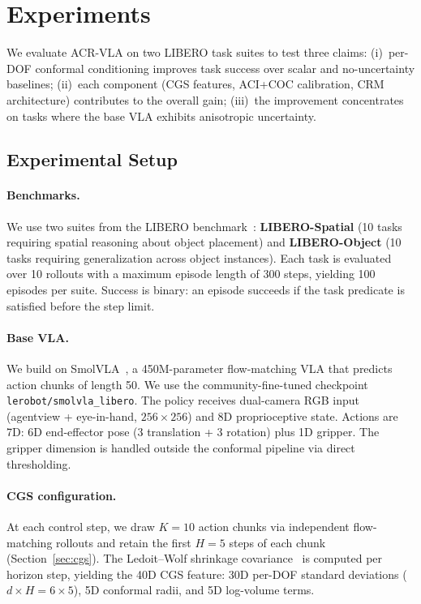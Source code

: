 \section{Experiments}
\label{sec:experiments}

We evaluate ACR-VLA on two LIBERO task suites to test three claims:
(i)~per-DOF conformal conditioning improves task success over scalar and no-uncertainty baselines;
(ii)~each component (CGS features, ACI+COC calibration, CRM architecture) contributes to the overall gain;
(iii)~the improvement concentrates on tasks where the base VLA exhibits anisotropic uncertainty.


\subsection{Experimental Setup}
\label{sec:exp_setup}

\paragraph{Benchmarks.}
We use two suites from the LIBERO benchmark~\cite{liu2023libero}:
\textbf{LIBERO-Spatial} (10 tasks requiring spatial reasoning about object placement) and \textbf{LIBERO-Object} (10 tasks requiring generalization across object instances).
Each task is evaluated over 10 rollouts with a maximum episode length of 300 steps, yielding 100 episodes per suite.
Success is binary: an episode succeeds if the task predicate is satisfied before the step limit.

\paragraph{Base VLA.}
We build on SmolVLA~\cite{shukor2025smolvla}, a 450M-parameter flow-matching VLA that predicts action chunks of length 50.
We use the community-fine-tuned checkpoint \texttt{lerobot/smolvla\_libero}.
The policy receives dual-camera RGB input (agentview + eye-in-hand, $256{\times}256$) and 8D proprioceptive state.
Actions are 7D: 6D end-effector pose (3 translation + 3 rotation) plus 1D gripper.
The gripper dimension is handled outside the conformal pipeline via direct thresholding.

\paragraph{CGS configuration.}
At each control step, we draw $K{=}10$ action chunks via independent flow-matching rollouts and retain the first $H{=}5$ steps of each chunk (Section~\ref{sec:cgs}).
The Ledoit--Wolf shrinkage covariance~\cite{ledoit2004well} is computed per horizon step, yielding the 40D CGS feature: 30D per-DOF standard deviations ($d{\times}H = 6{\times}5$), 5D conformal radii, and 5D log-volume terms.


